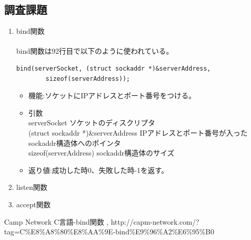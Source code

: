\documentclass[a4j]{celb-report}
\begin{document}
\subsection{調査課題}
\begin{enumerate}
 \renewcommand{\labelenumi}{(\arabic{enumi})}
 \item bind関数\\
\\
bind関数は92行目で以下のように使われている。
  \begin{lstlisting}[basicstyle=\ttfamily\footnotesize, frame=single]
    bind(serverSocket, (struct sockaddr *)&serverAddress, 
        sizeof(serverAddress));
  \end{lstlisting}
  \begin{itemize}
   \item 機能:ソケットにIPアドレスとポート番号をつける。
   \item 引数\\
serverSocket ソケットのディスクリプタ\\
(struct sockaddr *)\&serverAddress IPアドレスとポート番号が入ったsockaddr構造体へのポインタ\\
sizeof(serverAddress) sockaddr構造体のサイズ
   \item 返り値:成功した時0、失敗した時-1を返す。
  \end{itemize}
 \item listen関数
 \item accept関数
\end{enumerate}
\newpage
\begin{thebibliography}{9}

 Camp Network C言語-bind関数 , http://capm-network.com/?tag=C\%E8\%A8\%80\%E8\%AA\%9E-bind\%E9\%96\%A2\%E6\%95\%B0
\end{thebibliography}
%
\end{document}
